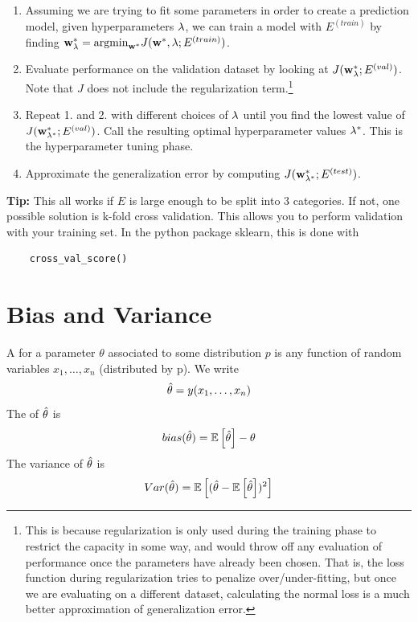 \begin{enumerate}
    \item Assuming we are trying to fit some parameters in order to create a prediction model, given hyperparameters $\vlambda$, we can train a model with $E^{{(train)}}$ by finding $\vw^{*}_{\vlambda} = \argmin_{\vw^{*}} J (\vw^{*}, \vlambda; E^{{(train)}})$.
    \item Evaluate performance on the validation dataset by looking at $J(\vw_{\vlambda}^{*} ; E^{{(val)}})$. Note that $J$ does not include the regularization term.\footnote{This is because regularization is only used during the training phase to restrict the capacity in some way, and would throw off any evaluation of performance once the parameters have already been chosen. That is, the loss function during regularization tries to penalize over/under-fitting, but once we are evaluating on a different dataset, calculating the normal loss is a much better approximation of generalization error. }
    \item Repeat 1. and 2. with different choices of $\vlambda$ until you find the lowest value of $J(\vw_{\vlambda^{*}}^{*} ; E^{{(val)}})$. Call the resulting optimal hyperparameter values $\vlambda^{*}$. This is the hyperparameter tuning phase.
    \item Approximate the generalization error by computing $J(\vw_{\vlambda^{*}}^{*} ; E^{{(test)}})$.
\end{enumerate}

\textbf{Tip:} This all works if $E$ is large enough to be split into 3 categories. If not, one possible solution is k-fold cross validation. This allows you to perform validation with your training set. In the python package sklearn, this is done with 


\begin{verbatim}
    cross_val_score()
\end{verbatim}

\section{Bias and Variance}

\begin{definition}
    A  for a parameter $\theta$ associated to some distribution $p$ is any function of random variables $x_{1}, \ldots, x_{n}$ (distributed by p). We write
    \[\thetahat = y(x_{1}, \ldots, x_{n} ) \]
    The  of $\thetahat$ is
    \[bias(\thetahat) = \Ev\left[\thetahat\right] - \theta\]
    The variance of $\thetahat$ is 
    \[Var(\thetahat) = \Ev \left[(\thetahat - \Ev \left[ \thetahat \right])^{2} \right] \]
\end{definition}

